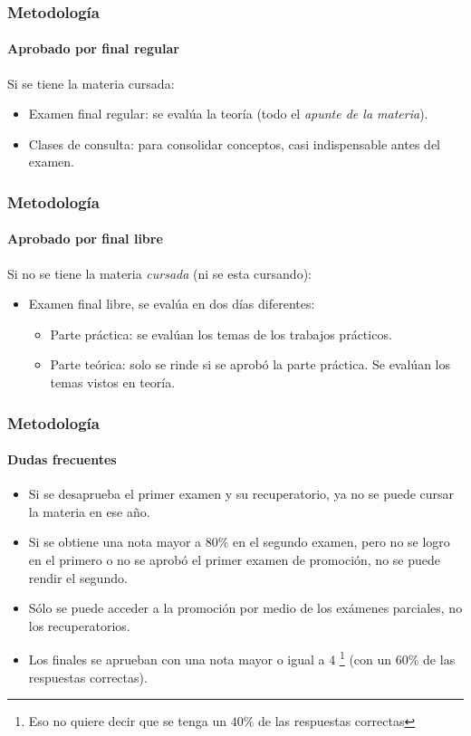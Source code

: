 \documentclass[11pt,a4paper,spanish]{beamer}
\begin{document}
\begin{frame}

    \frametitle{Metodología}
    \framesubtitle{Aprobado por final regular}

Si se tiene la materia cursada:
\begin{itemize}
    \item Examen final regular: se evalúa la teoría (todo el \emph{apunte de
        la materia}).
    \item Clases de consulta: para consolidar conceptos, casi indispensable
        antes del examen.
\end{itemize}

\end{frame}

\begin{frame}

    \frametitle{Metodología}
    \framesubtitle{Aprobado por final libre}

    Si no se tiene la materia \emph{cursada} (ni se esta cursando):

\begin{itemize}
    \item Examen final libre, se evalúa en dos días diferentes:
        \begin{itemize}
            \item Parte práctica: se evalúan los temas de los trabajos
                prácticos.
            \item Parte teórica: solo se rinde si se aprobó la parte práctica.
                Se evalúan los temas vistos en teoría.
        \end{itemize}
\end{itemize}

\end{frame}

\begin{frame}

    \frametitle{Metodología}
    \framesubtitle{Dudas frecuentes}

\begin{itemize}

    \item Si se desaprueba el primer examen y su recuperatorio, ya no se puede
        cursar la materia en ese año.
    \item Si se obtiene una nota mayor a $80\%$ en el segundo examen, pero no
        se logro en el primero o no se aprobó el primer examen de promoción,
        no se puede rendir el segundo.
    \item Sólo se puede acceder a la promoción por medio de los exámenes
        parciales, no los recuperatorios.
    \item Los finales se aprueban con una nota mayor o igual a 4 \footnote{Eso
        no quiere decir que se tenga un $40\%$ de las respuestas correctas}
        (con un $60\%$ de las respuestas correctas).

\end{itemize}

\end{frame}
\end{document}
